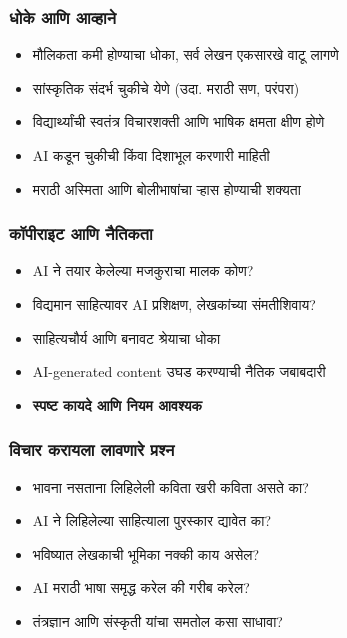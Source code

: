 \begin{frame}[fragile]\frametitle{धोके आणि आव्हाने}

\begin{itemize}
\item मौलिकता कमी होण्याचा धोका, सर्व लेखन एकसारखे वाटू लागणे
\item सांस्कृतिक संदर्भ चुकीचे येणे (उदा. मराठी सण, परंपरा)
\item विद्यार्थ्यांची स्वतंत्र विचारशक्ती आणि भाषिक क्षमता क्षीण होणे
\item AI कडून चुकीची किंवा दिशाभूल करणारी माहिती
\item मराठी अस्मिता आणि बोलीभाषांचा ऱ्हास होण्याची शक्यता
\end{itemize}

\end{frame}

\begin{frame}[fragile]\frametitle{कॉपीराइट आणि नैतिकता}

\begin{itemize}
\item AI ने तयार केलेल्या मजकुराचा मालक कोण?
\item विद्यमान साहित्यावर AI प्रशिक्षण, लेखकांच्या संमतीशिवाय?
\item साहित्यचौर्य आणि बनावट श्रेयाचा धोका
\item AI-generated content उघड करण्याची नैतिक जबाबदारी
\item \textbf{स्पष्ट कायदे आणि नियम आवश्यक}
\end{itemize}

\end{frame}

\begin{frame}[fragile]\frametitle{विचार करायला लावणारे प्रश्न}

\begin{itemize}
\item भावना नसताना लिहिलेली कविता खरी कविता असते का?
\item AI ने लिहिलेल्या साहित्याला पुरस्कार द्यावेत का?
\item भविष्यात लेखकाची भूमिका नक्की काय असेल?
\item AI मराठी भाषा समृद्ध करेल की गरीब करेल?
\item तंत्रज्ञान आणि संस्कृती यांचा समतोल कसा साधावा?
\end{itemize}

\end{frame}


